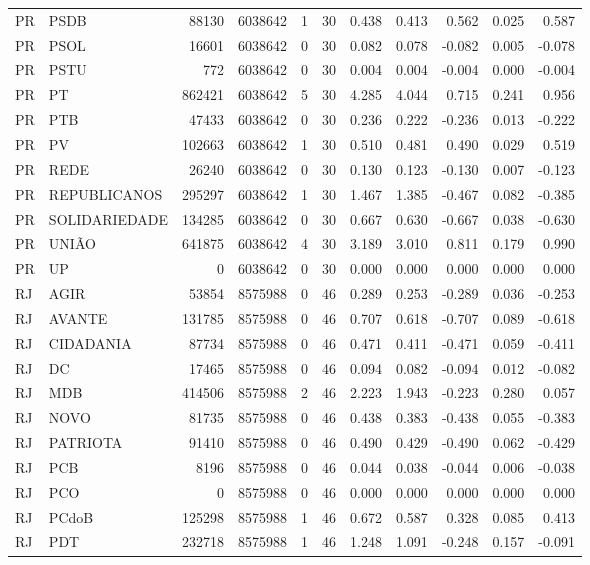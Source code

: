 \begin{landscape}
\begin{longtable}{llrrrrrrrrr}
PR & PSDB & 88130 & 6038642 & 1 & 30 & 0.438 & 0.413 & 0.562 & 0.025 & 0.587 \\
PR & PSOL & 16601 & 6038642 & 0 & 30 & 0.082 & 0.078 & -0.082 & 0.005 & -0.078 \\
PR & PSTU & 772 & 6038642 & 0 & 30 & 0.004 & 0.004 & -0.004 & 0.000 & -0.004 \\
PR & PT & 862421 & 6038642 & 5 & 30 & 4.285 & 4.044 & 0.715 & 0.241 & 0.956 \\
PR & PTB & 47433 & 6038642 & 0 & 30 & 0.236 & 0.222 & -0.236 & 0.013 & -0.222 \\
PR & PV & 102663 & 6038642 & 1 & 30 & 0.510 & 0.481 & 0.490 & 0.029 & 0.519 \\
PR & REDE & 26240 & 6038642 & 0 & 30 & 0.130 & 0.123 & -0.130 & 0.007 & -0.123 \\
PR & REPUBLICANOS & 295297 & 6038642 & 1 & 30 & 1.467 & 1.385 & -0.467 & 0.082 & -0.385 \\
PR & SOLIDARIEDADE & 134285 & 6038642 & 0 & 30 & 0.667 & 0.630 & -0.667 & 0.038 & -0.630 \\
PR & UNIÃO & 641875 & 6038642 & 4 & 30 & 3.189 & 3.010 & 0.811 & 0.179 & 0.990 \\
PR & UP & 0 & 6038642 & 0 & 30 & 0.000 & 0.000 & 0.000 & 0.000 & 0.000 \\
RJ & AGIR & 53854 & 8575988 & 0 & 46 & 0.289 & 0.253 & -0.289 & 0.036 & -0.253 \\
RJ & AVANTE & 131785 & 8575988 & 0 & 46 & 0.707 & 0.618 & -0.707 & 0.089 & -0.618 \\
RJ & CIDADANIA & 87734 & 8575988 & 0 & 46 & 0.471 & 0.411 & -0.471 & 0.059 & -0.411 \\
RJ & DC & 17465 & 8575988 & 0 & 46 & 0.094 & 0.082 & -0.094 & 0.012 & -0.082 \\
RJ & MDB & 414506 & 8575988 & 2 & 46 & 2.223 & 1.943 & -0.223 & 0.280 & 0.057 \\
RJ & NOVO & 81735 & 8575988 & 0 & 46 & 0.438 & 0.383 & -0.438 & 0.055 & -0.383 \\
RJ & PATRIOTA & 91410 & 8575988 & 0 & 46 & 0.490 & 0.429 & -0.490 & 0.062 & -0.429 \\
RJ & PCB & 8196 & 8575988 & 0 & 46 & 0.044 & 0.038 & -0.044 & 0.006 & -0.038 \\
RJ & PCO & 0 & 8575988 & 0 & 46 & 0.000 & 0.000 & 0.000 & 0.000 & 0.000 \\
RJ & PCdoB & 125298 & 8575988 & 1 & 46 & 0.672 & 0.587 & 0.328 & 0.085 & 0.413 \\
RJ & PDT & 232718 & 8575988 & 1 & 46 & 1.248 & 1.091 & -0.248 & 0.157 & -0.091 \\

\end{longtable}
\end{landscape}
